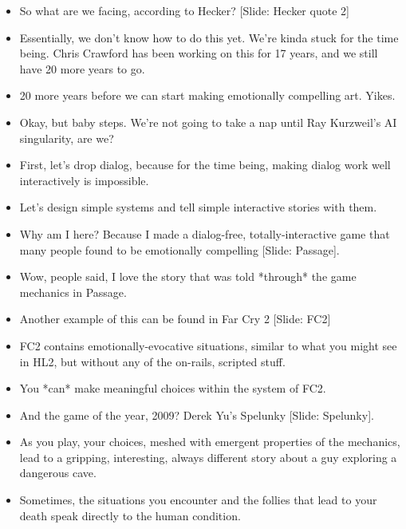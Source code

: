 \documentclass[12pt]{article}
\begin{document}
{\begin{itemize}
\item So what are we facing, according to Hecker?  [Slide:  Hecker quote 2]


\item Essentially, we don't know how to do this yet.  We're kinda stuck for the time being.  Chris Crawford has been working on this for 17 years, and we still have 20 more years to go.

\item 20 more years before we can start making emotionally compelling art.  Yikes.

\item Okay, but baby steps.  We're not going to take a nap until Ray Kurzweil's AI singularity, are we?  

\item First, let's drop dialog, because for the time being, making dialog work well interactively is impossible.  

\item Let's design simple systems and tell simple interactive stories with them.  

\item Why am I here?  Because I made a dialog-free, totally-interactive game that many people found to be emotionally compelling [Slide: Passage].  

\item Wow, people said, I love the story that was told *through* the game mechanics in Passage.

\item Another example of this can be found in Far Cry 2 [Slide: FC2]

\item FC2 contains emotionally-evocative situations, similar to what you might see in HL2, but without any of the on-rails, scripted stuff.  

\item You *can* make meaningful choices within the system of FC2.

\item And the game of the year, 2009?  Derek Yu's Spelunky [Slide: Spelunky].  

\item As you play, your choices, meshed with emergent properties of the mechanics, lead to a gripping, interesting, always different story about a guy exploring a dangerous cave.  

\item Sometimes, the situations you encounter and the follies that lead to your death speak directly to the human condition.  


\end{itemize}}
\end{document}
